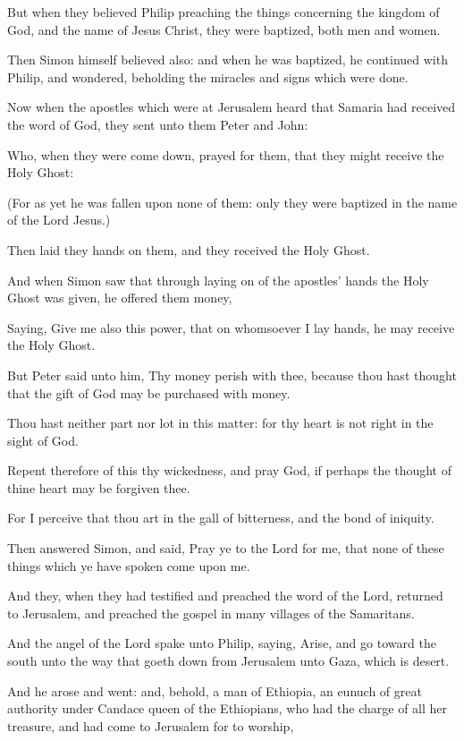 {But
when they
believed
Philip
preaching the
things
concerning the
kingdom of
God,
and the
name of
Jesus
Christ, they were
baptized,
both
men
and
women.

Then
Simon
himself
believed
also:
and when he
was
baptized, he
continued with
Philip,
and
wondered,
beholding the
miracles
and
signs which were
done.

Now
when the
apostles which
were
at
Jerusalem
heard
that
Samaria had
received the
word of
God, they
sent
unto
them
Peter
and
John:

Who, when they were come
down,
prayed
for
them,
that they might
receive the
Holy
Ghost:

(For as
yet he
was
fallen
upon
none of
them:
only they
were
baptized
in the
name of the
Lord
Jesus.)

Then laid
they
{}
hands
on
them,
and they
received the
Holy
Ghost.

And when
Simon
saw
that
through laying
on of the
apostles’
hands the
Holy
Ghost was
given, he
offered
them
money,

Saying, Give
me
also
this
power,
that on
whomsoever I
lay
hands, he may
receive the
Holy
Ghost.

But
Peter
said
unto
him,
Thy
money
perish
with
thee,
because thou hast
thought
that the
gift of
God may be
purchased with
money.

Thou
hast
neither
part
nor
lot
in
this
matter:
for
thy
heart
is
not
right in the sight
of
God.

Repent
therefore
of
this
thy
wickedness,
and
pray
God,
if
perhaps the
thought of
thine
heart may be
forgiven
thee.

For I
perceive that
thou
art
in the
gall of
bitterness,
and
{} the
bond of
iniquity.

Then
answered
Simon, and
said,
Pray
ye
to the
Lord
for
me,
that none of these
things
which ye have
spoken
come
upon
me.

And
they, when they had
testified
and
preached the
word of the
Lord,
returned
to
Jerusalem,
and preached the
gospel in
many
villages of the
Samaritans.

And the
angel of the
Lord
spake
unto
Philip,
saying,
Arise,
and
go
toward the
south
unto the
way
that goeth
down
from
Jerusalem
unto
Gaza,
which
is
desert.

And he
arose and
went:
and,
behold, a
man of
Ethiopia, an
eunuch of great
authority under
Candace
queen of the
Ethiopians,
who
had the charge
of
all
her
treasure, and had
come
to
Jerusalem for to
worship,

}
